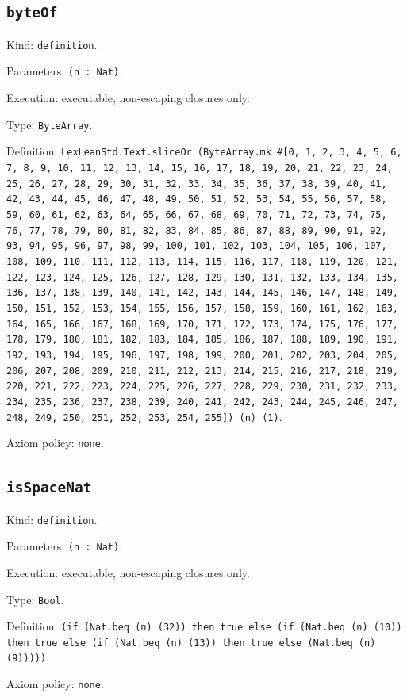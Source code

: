 \documentclass[11pt]{article}
\begin{document}
\subsection*{\texttt{byteOf}}
\noindent Kind: \texttt{definition}.\par
\noindent Parameters: \texttt{(n : Nat)}.\par
\noindent Execution: executable, non-escaping closures only.\par
\noindent Type: \texttt{ByteArray}.\par
\noindent Definition: \texttt{LexLeanStd.Text.sliceOr (ByteArray.mk \#[0, 1, 2, 3, 4, 5, 6, 7, 8, 9, 10, 11, 12, 13, 14, 15, 16, 17, 18, 19, 20, 21, 22, 23, 24, 25, 26, 27, 28, 29, 30, 31, 32, 33, 34, 35, 36, 37, 38, 39, 40, 41, 42, 43, 44, 45, 46, 47, 48, 49, 50, 51, 52, 53, 54, 55, 56, 57, 58, 59, 60, 61, 62, 63, 64, 65, 66, 67, 68, 69, 70, 71, 72, 73, 74, 75, 76, 77, 78, 79, 80, 81, 82, 83, 84, 85, 86, 87, 88, 89, 90, 91, 92, 93, 94, 95, 96, 97, 98, 99, 100, 101, 102, 103, 104, 105, 106, 107, 108, 109, 110, 111, 112, 113, 114, 115, 116, 117, 118, 119, 120, 121, 122, 123, 124, 125, 126, 127, 128, 129, 130, 131, 132, 133, 134, 135, 136, 137, 138, 139, 140, 141, 142, 143, 144, 145, 146, 147, 148, 149, 150, 151, 152, 153, 154, 155, 156, 157, 158, 159, 160, 161, 162, 163, 164, 165, 166, 167, 168, 169, 170, 171, 172, 173, 174, 175, 176, 177, 178, 179, 180, 181, 182, 183, 184, 185, 186, 187, 188, 189, 190, 191, 192, 193, 194, 195, 196, 197, 198, 199, 200, 201, 202, 203, 204, 205, 206, 207, 208, 209, 210, 211, 212, 213, 214, 215, 216, 217, 218, 219, 220, 221, 222, 223, 224, 225, 226, 227, 228, 229, 230, 231, 232, 233, 234, 235, 236, 237, 238, 239, 240, 241, 242, 243, 244, 245, 246, 247, 248, 249, 250, 251, 252, 253, 254, 255]) (n) (1)}.\par
\noindent Axiom policy: \texttt{none}.\par
\subsection*{\texttt{isSpaceNat}}
\noindent Kind: \texttt{definition}.\par
\noindent Parameters: \texttt{(n : Nat)}.\par
\noindent Execution: executable, non-escaping closures only.\par
\noindent Type: \texttt{Bool}.\par
\noindent Definition: \texttt{(if (Nat.beq (n) (32)) then true else (if (Nat.beq (n) (10)) then true else (if (Nat.beq (n) (13)) then true else (Nat.beq (n) (9)))))}.\par
\noindent Axiom policy: \texttt{none}.\par
\end{document}
